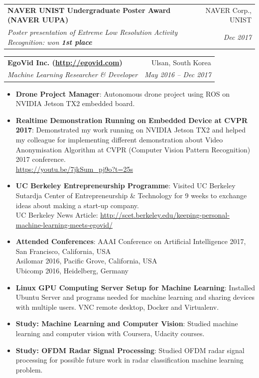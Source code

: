 \documentclass[letterpaper,11pt]{article}
\makeatletter
\def \includeMinor {}
\newcommand{\resumeItem}[2]{
  \item\small{
    \textbf{#1}{: #2 \vspace{-2pt}}
  }
}
\newcommand{\resumeSubheading}[4]{
  \vspace{-1pt}\item
    \begin{tabular*}{0.97\textwidth}{l@{\extracolsep{\fill}}r}
      \textbf{#1} & #2 \\
      \textit{\small#3} & \textit{\small #4} \\
    \end{tabular*}\vspace{-5pt}
}
\newcommand{\resumeItemListStart}{\begin{itemize}}
\newcommand{\resumeItemListEnd}{\end{itemize}\vspace{-5pt}}
\makeatother
\begin{document}
    \resumeSubheading
      {NAVER UNIST Undergraduate Poster Award (NAVER UUPA)}{NAVER Corp., UNIST}
      {Poster presentation of Extreme Low Resolution Activity Recognition: won \textbf{1st place}}{Dec 2017}
    \resumeSubheading
      {EgoVid Inc. (\href{http://egovid.com}{http://egovid.com})}{Ulsan, South Korea}
      {Machine Learning Researcher \& Developer}{May 2016 -- Dec 2017}
      \resumeItemListStart
        \ifdefined \includeMinor
        \resumeItem{Drone Project Manager}
          {Autonomous drone project using ROS on NVIDIA Jetson TX2 embedded board.}
        \fi
        \resumeItem{Realtime Demonstration Running on Embedded Device at CVPR 2017}
          {Demonstrated my work running on NVIDIA Jetson TX2 and helped my colleague for implementing different demonstration about Video Anonymisation Algorithm at CVPR (Computer Vision Pattern Recognition) 2017 conference.\\
          \href{https://youtu.be/7jkSum_pj9o?t=25s}{\underline{https://youtu.be/7jkSum\_pj9o?t=25s}}}
        \resumeItem{UC Berkeley Entrepreneurship Programme}
          {Visited UC Berkeley Sutardja Center of Entrepreneurship \& Technology for 9 weeks to exchange ideas about making a start-up company.\\
          UC Berkeley News Article: \href{http://scet.berkeley.edu/keeping-personal-machine-learning-meets-egovid}{\underline{http://scet.berkeley.edu/keeping-personal-machine-learning-meets-egovid/}}}
        \resumeItem{Attended Conferences}
          {AAAI Conference on Artificial Intelligence 2017, San Francisco, California, USA\\
          Asilomar 2016, Pacific Grove, California, USA\\
          Ubicomp 2016, Heidelberg, Germany}
          
        \ifdefined \includeMinor
        \resumeItem{Linux GPU Computing Server Setup for Machine Learning}
          {Installed Ubuntu Server and programs needed for machine learning and sharing devices with multiple users. VNC remote desktop, Docker and Virtualenv.}
        \fi
          
        \ifdefined \includeMinor
        \resumeItem{Study: Machine Learning and Computer Vision}
          {Studied machine learning and computer vision with Coursera, Udacity courses.}
        \resumeItem{Study: OFDM Radar Signal Processing}
          {Studied OFDM radar signal processing for possible future work in radar classification machine learning problem.}
        \fi
      \resumeItemListEnd
    
\end{document}
